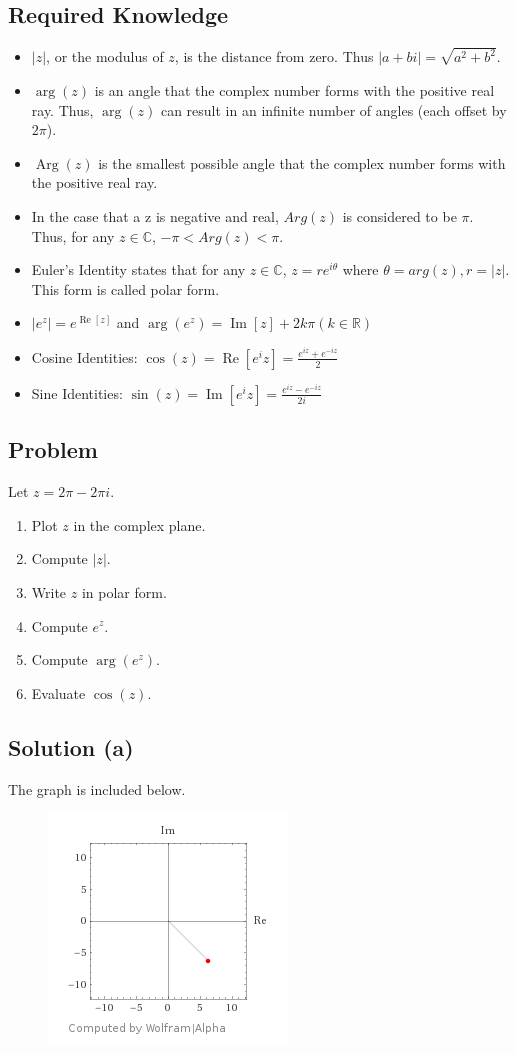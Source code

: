 \documentclass[12pt]{article}
\newcommand{\real}{\mathbb{R}}
\newcommand{\complex}{\mathbb{C}}
\newcommand{\Arg}{\operatorname{Arg}}
\renewcommand{\Re}{\operatorname{Re}}
\renewcommand{\Im}{\operatorname{Im}}
\begin{document}
\subsection{Required Knowledge}
\begin{itemize}
    \item $|z|$, or the modulus of $z$, is the distance from zero.  Thus $|a+bi|=\sqrt{a^2+b^2}$.
    \item $\arg(z)$ is an angle that the complex number forms with the positive real ray.  Thus, $\arg(z)$ can result in an infinite number of angles (each offset by $2\pi$).
    \item $\Arg(z)$ is the smallest possible angle that the complex number forms with the positive real ray.
    \item In the case that a z is negative and real, $Arg(z)$ is considered to be $\pi$.  Thus, for any $z\in\complex$, $-\pi<Arg(z)<\pi$.
    \item Euler's Identity states that for any $z\in\complex$, $z=re^{i\theta}$ where $\theta=arg(z), r=|z|$.  This form is called polar form.
    \item $|e^z|=e^{\Re[z]}$ and $\arg(e^z)=\Im[z]+2k\pi (k\in\real)$
    \item Cosine Identities: $\cos(z)=\Re[e^iz]=\frac{e^{iz}+e^{-iz}}{2}$
    \item Sine Identities: $\sin(z)=\Im[e^iz]=\frac{e^{iz}-e^{-iz}}{2i}$
\end{itemize}
\subsection{Problem}
Let $z=2\pi-2\pi i$.
\begin{enumerate}[label=\alph*. ]
    \item Plot $z$ in the complex plane.
    \item Compute $|z|$.
    \item Write $z$ in polar form.
    \item Compute $e^z$.
    \item Compute $\arg(e^z)$.
    \item Evaluate $\cos(z)$.
\end{enumerate}
\subsection{Solution (a)}
The graph is included below.
\begin{figure}[H]
    \includegraphics{Topic2Graph.png}
\end{figure}
\end{document}

